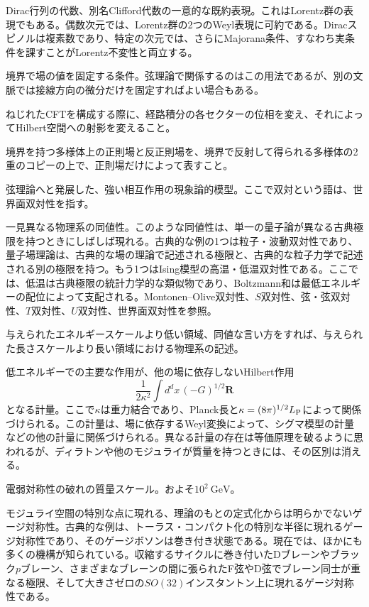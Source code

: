 {Dirac行列の代数、別名Clifford代数の一意的な既約表現。これはLorentz群の表現でもある。偶数次元では、Lorentz群の2つのWeyl表現に可約である。Diracスピノルは複素数であり、特定の次元では、さらにMajorana条件、すなわち実条件を課すことがLorentz不変性と両立する。}

{境界で場の値を固定する条件。弦理論で関係するのはこの用法であるが、別の文脈では接線方向の微分だけを固定すればよい場合もある。}

{ねじれたCFTを構成する際に、経路積分の各セクターの位相を変え、それによってHilbert空間への射影を変えること。}

{境界を持つ多様体上の正則場と反正則場を、境界で反射して得られる多様体の2重のコピーの上で、正則場だけによって表すこと。}

{弦理論へと発展した、強い相互作用の現象論的模型。ここで双対という語は、世界面双対性を指す。}

{一見異なる物理系の同値性。このような同値性は、単一の量子論が異なる古典極限を持つときにしばしば現れる。古典的な例の1つは粒子・波動双対性であり、量子場理論は、古典的な場の理論で記述される極限と、古典的な粒子力学で記述される別の極限を持つ。もう1つはIsing模型の高温・低温双対性である。ここでは、低温は古典極限の統計力学的な類似物であり、Boltzmann和は最低エネルギーの配位によって支配される。Montonen--Olive双対性、$S$双対性、弦・弦双対性、$T$双対性、$U$双対性、世界面双対性を参照。}

{与えられたエネルギースケールより低い領域、同値な言い方をすれば、与えられた長さスケールより長い領域における物理系の記述。}

{低エネルギーでの主要な作用が、他の場に依存しないHilbert作用
\[
\frac{1}{2\kappa^2}\int d^d x\,(-G)^{1/2}\bm R
\]
となる計量。ここで$\kappa$は重力結合であり、Planck長と$\kappa=(8\pi)^{1/2}L_{\rm P}$によって関係づけられる。この計量は、場に依存するWeyl変換によって、シグマ模型の計量などの他の計量に関係づけられる。異なる計量の存在は等価原理を破るように思われるが、ディラトンや他のモジュライが質量を持つときには、その区別は消える。}

{電弱対称性の破れの質量スケール。およそ$10^2\ \mathrm{GeV}$。}

{モジュライ空間の特別な点に現れる、理論のもとの定式化からは明らかでないゲージ対称性。古典的な例は、トーラス・コンパクト化の特別な半径に現れるゲージ対称性であり、そのゲージボソンは巻き付き状態である。現在では、ほかにも多くの機構が知られている。収縮するサイクルに巻き付いたDブレーンやブラック$p$ブレーン、さまざまなブレーンの間に張られたF弦やD弦でブレーン同士が重なる極限、そして大きさゼロの$SO(32)$インスタントン上に現れるゲージ対称性である。}


